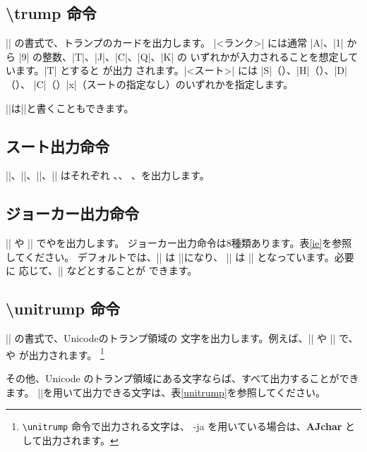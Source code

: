 \documentclass{jlreq}
\begin{document}
\subsection{\textbackslash trump 命令}
|| の書式で、トランプのカードを出力します。
|<ランク>| には通常 |A|、|1| から |9| の整数、|T|、|J|、|C|、|Q|、|K| の
いずれかが入力されることを想定しています。|T| とすると
{}が出力
されます。|<スート>| には |S|（\hmS）、|H|（\hmH）、|D|（\hmD）、
|C|（\hmC）|x|（スートの指定なし）のいずれかを指定します。

||は||と書くこともできます。

\subsection{スート出力命令}
|\hmS|、|\hmH|、|\hmD|、|\hmC| はそれぞれ \hmS、\hmH、
\hmD、\hmC を出力します。

\subsection{ジョーカー出力命令}
|\JOKER| や |\joker| で\JOKER や\joker を出力します。
ジョーカー出力命令は8種類あります。表\ref{ie}を参照してください。
デフォルトでは、|\JOKER| は |\BLACKJOKER|になり、
|\joker| は |\blackjoker| となっています。必要に
応じて、|\renewcommand{\joker}{\whitejoker}| などとすることが
できます。

\subsection{\textbackslash unitrump 命令}
|| の書式で、Unicodeのトランプ領域の
文字を出力します。例えば、|| や || で、
 や  が出力されます。
\footnote{\texttt{\textbackslash unitrump} 命令で出力される文字は、
\LuaLaTeX-ja を用いている場合は、\textbf{AJchar} として出力されます。}

その他、Unicode のトランプ領域にある文字ならば、すべて出力することができます。
|\unitrump|を用いて出力できる文字は、表\ref{unitrump}を参照してください。
\end{document}
